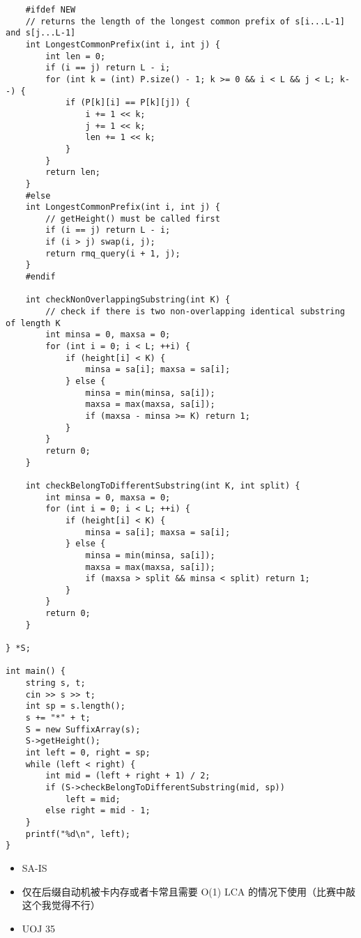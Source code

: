 \documentclass[]{article}
\providecommand{\tightlist}{%
  \setlength{\itemsep}{0pt}\setlength{\parskip}{0pt}}
\begin{document}
\begin{verbatim}
    #ifdef NEW
    // returns the length of the longest common prefix of s[i...L-1] and s[j...L-1]
    int LongestCommonPrefix(int i, int j) {
        int len = 0;
        if (i == j) return L - i;
        for (int k = (int) P.size() - 1; k >= 0 && i < L && j < L; k--) {
            if (P[k][i] == P[k][j]) {
                i += 1 << k;
                j += 1 << k;
                len += 1 << k;
            }
        }
        return len;
    }
    #else
    int LongestCommonPrefix(int i, int j) {
        // getHeight() must be called first
        if (i == j) return L - i;
        if (i > j) swap(i, j);
        return rmq_query(i + 1, j);
    }
    #endif

    int checkNonOverlappingSubstring(int K) {
        // check if there is two non-overlapping identical substring of length K
        int minsa = 0, maxsa = 0;
        for (int i = 0; i < L; ++i) {
            if (height[i] < K) {
                minsa = sa[i]; maxsa = sa[i];
            } else {
                minsa = min(minsa, sa[i]);
                maxsa = max(maxsa, sa[i]);
                if (maxsa - minsa >= K) return 1;
            }
        }
        return 0;
    }

    int checkBelongToDifferentSubstring(int K, int split) {
        int minsa = 0, maxsa = 0;
        for (int i = 0; i < L; ++i) {
            if (height[i] < K) {
                minsa = sa[i]; maxsa = sa[i];
            } else {
                minsa = min(minsa, sa[i]);
                maxsa = max(maxsa, sa[i]);
                if (maxsa > split && minsa < split) return 1;
            }
        }
        return 0;
    }

} *S;

int main() {
    string s, t;
    cin >> s >> t;
    int sp = s.length();
    s += "*" + t;
    S = new SuffixArray(s);
    S->getHeight();
    int left = 0, right = sp;
    while (left < right) {
        int mid = (left + right + 1) / 2;
        if (S->checkBelongToDifferentSubstring(mid, sp))
            left = mid;
        else right = mid - 1;
    }
    printf("%d\n", left);
}
\end{verbatim}

\begin{itemize}
\tightlist
\item
  SA-IS
\item
  仅在后缀自动机被卡内存或者卡常且需要 O(1) LCA
  的情况下使用（比赛中敲这个我觉得不行）
\item
  UOJ 35
\end{itemize}
\end{document}
